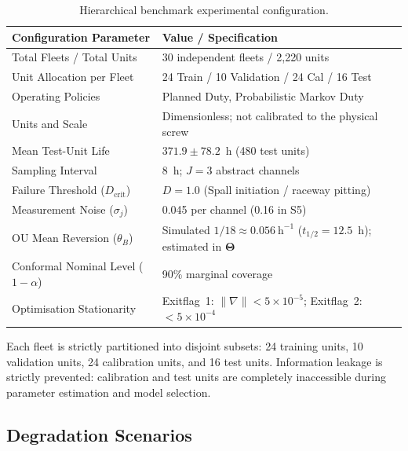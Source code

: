 \documentclass[a4paper,fleqn]{cas-dc}
\newcommand{\Dcrit}{D_{\mathrm{crit}}}
\begin{document}
\begin{table}[pos=!t]
\centering
\caption{Hierarchical benchmark experimental configuration.}
\label{tab:benchmark_setup}
\renewcommand{\arraystretch}{1.12}
\setlength{\tabcolsep}{3.5pt}
\small
\begin{tabularx}{\columnwidth}{@{}l X@{}}
\toprule
\textbf{Configuration Parameter} & \textbf{Value / Specification} \\
\midrule
Total Fleets / Total Units & 30 independent fleets / 2,220 units \\
Unit Allocation per Fleet  & 24 Train / 10 Validation / 24 Cal / 16 Test \\
Operating Policies         & Planned Duty, Probabilistic Markov Duty \\
Units and Scale & Dimensionless; not calibrated to the physical screw \\
Mean Test-Unit Life & $371.9 \pm 78.2$~h (480 test units) \\
Sampling Interval & 8~h; $J = 3$ abstract channels \\
Failure Threshold ($\Dcrit$)  & $D = 1.0$ (Spall initiation / raceway pitting) \\
Measurement Noise ($\sigma_j$) & 0.045 per channel (0.16 in S5) \\
OU Mean Reversion ($\theta_B$) & Simulated $1/18 \approx 0.056~\mathrm{h}^{-1}$ ($t_{1/2} = 12.5$~h); estimated in $\boldsymbol{\Theta}$ \\
Conformal Nominal Level ($1-\alpha$) & 90\% marginal coverage \\
Optimisation Stationarity  & Exitflag~1: $\|\nabla\| < 5 \times 10^{-5}$; Exitflag~2: $< 5 \times 10^{-4}$ \\
\bottomrule
\end{tabularx}
\end{table}

Each fleet is strictly partitioned into disjoint subsets: 24 training units, 10 validation units, 24 calibration units, and 16 test units. Information leakage is strictly prevented: calibration and test units are completely inaccessible during parameter estimation and model selection.

\subsection{Degradation Scenarios}
\label{subsec:scenarios}
\end{document}
